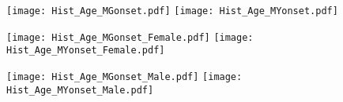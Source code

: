 \documentclass{article}
\begin{document}
\begin{figure}[p]
  \centering
  \captionsetup{labelformat=empty}

  \newcommand{\figwidth}{0.48\textwidth}

  \texttt{[image: Hist\_Age\_MGonset.pdf]}
  \hspace{0.01\textwidth}
  \texttt{[image: Hist\_Age\_MYonset.pdf]}

  \vspace{0.01\textheight}

  \texttt{[image: Hist\_Age\_MGonset\_Female.pdf]}
  \hspace{0.01\textwidth}
  \texttt{[image: Hist\_Age\_MYonset\_Female.pdf]}

  \vspace{0.01\textheight}

  \texttt{[image: Hist\_Age\_MGonset\_Male.pdf]}
  \hspace{0.01\textwidth}
  \texttt{[image: Hist\_Age\_MYonset\_Male.pdf]}

\end{figure}
\end{document}
